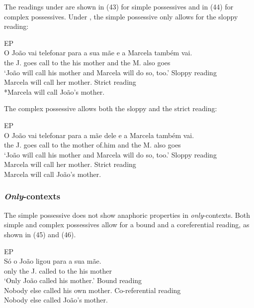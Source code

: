 \documentclass[output=paper]{langsci/langscibook}
\begin{document}
The readings under  are shown in (43) for simple possessives and in (44) for complex possessives. Under , the simple possessive only allows for the sloppy reading:

\ea%
         EP\label{ex:wein:43}\\
    \ea  
    \gll O João vai telefonar para a sua mãe e a Marcela também vai.\\
         the J.   goes call to the his mother and the M. also goes\\
    \glt ‘João will call his mother and Marcela will do so, too.’
    \ex Sloppy reading\\
        Marcela will call her mother.
    \ex Strict reading\\
        *Marcela will call João’s mother.
    \z  
\z

\noindent The complex possessive allows both the sloppy and the strict reading:

\ea%
         EP\label{ex:wein:44}\\
    \ea  
    \gll O João vai telefonar para a mãe   dele e   a Marcela também vai.\\
         the J. goes call to the mother of.him and the M. also goes\\
    \glt ‘João will call his mother and Marcela will do so, too.’
    \ex  Sloppy reading\\
         Marcela will call her mother.
    \ex  Strict reading\\
         Marcela will call João’s mother.
    \z
\z



\subsubsection{\textit{Only}-contexts}%

The simple possessive does not show anaphoric properties in \textit{only}{}-contexts. Both simple and complex possessives allow for a bound and a coreferential reading, as shown in (45) and (46).

\ea%
         EP\label{ex:wein:45}\\
    \ea  
    \gll Só o João ligou para a sua mãe.\\
         only the J. called to the his mother\\
    \glt ‘Only João called his mother.’
    \ex  Bound reading\\
         Nobody else called his own mother.
    \ex  Co-referential reading\\
         Nobody else called João’s mother.
    \z
\z
\end{document}
